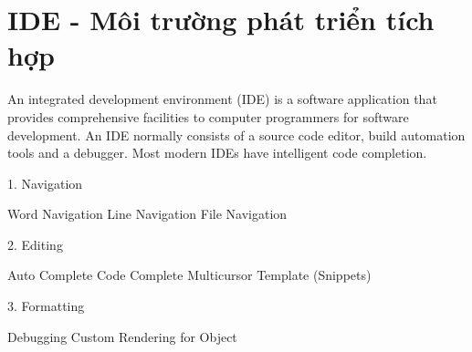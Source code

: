 \section{IDE - Môi trường phát triển tích hợp}

An integrated development environment (IDE) is a software application that provides comprehensive facilities to computer programmers for software development. An IDE normally consists of a source code editor, build automation tools and a debugger. Most modern IDEs have intelligent code completion.

1. Navigation

Word Navigation Line Navigation File Navigation

2. Editing

Auto Complete Code Complete Multicursor Template (Snippets)

3. Formatting

Debugging
Custom Rendering for Object